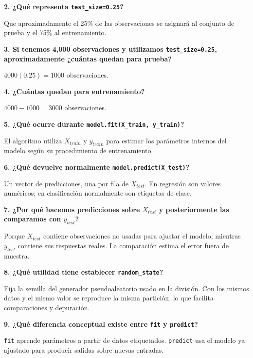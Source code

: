 \documentclass[11pt]{article}
\newcommand{\pregunta}[1]{\vspace{2mm}\textbf{#1}}
\begin{document}
\pregunta{2. ¿Qué representa \texttt{test\_size=0.25}?}
\begin{respuesta}
Que aproximadamente el 25\% de las observaciones se asignará al conjunto de prueba y el 75\% al entrenamiento.
\end{respuesta}

\pregunta{3. Si tenemos 4,000 observaciones y utilizamos \texttt{test\_size=0.25}, aproximadamente ¿cuántas quedan para prueba?}
\begin{respuesta}
$4000(0.25)=1000$ observaciones.
\end{respuesta}

\pregunta{4. ¿Cuántas quedan para entrenamiento?}
\begin{respuesta}
$4000-1000=3000$ observaciones.
\end{respuesta}

\pregunta{5. ¿Qué ocurre durante \texttt{model.fit(X\_train, y\_train)}?}
\begin{respuesta}
El algoritmo utiliza $X_{train}$ y $y_{train}$ para estimar los parámetros internos del modelo según su procedimiento de entrenamiento.
\end{respuesta}

\pregunta{6. ¿Qué devuelve normalmente \texttt{model.predict(X\_test)}?}
\begin{respuesta}
Un vector de predicciones, una por fila de $X_{test}$. En regresión son valores numéricos; en clasificación normalmente son etiquetas de clase.
\end{respuesta}

\pregunta{7. ¿Por qué hacemos predicciones sobre $X_{test}$ y posteriormente las comparamos con $y_{test}$?}
\begin{respuesta}
Porque $X_{test}$ contiene observaciones no usadas para ajustar el modelo, mientras $y_{test}$ contiene sus respuestas reales. La comparación estima el error fuera de muestra.
\end{respuesta}

\pregunta{8. ¿Qué utilidad tiene establecer \texttt{random\_state}?}
\begin{respuesta}
Fija la semilla del generador pseudoaleatorio usado en la división. Con los mismos datos y el mismo valor se reproduce la misma partición, lo que facilita comparaciones y depuración.
\end{respuesta}

\pregunta{9. ¿Qué diferencia conceptual existe entre \texttt{fit} y \texttt{predict}?}
\begin{respuesta}
\texttt{fit} aprende parámetros a partir de datos etiquetados. \texttt{predict} usa el modelo ya ajustado para producir salidas sobre nuevas entradas.
\end{respuesta}
\end{document}
